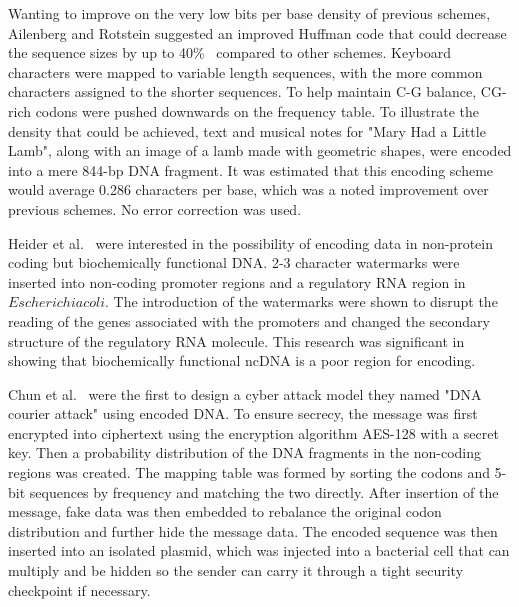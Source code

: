 \documentclass{bioinfo}
\begin{document}
Wanting to improve on the very low bits per base density of previous schemes, Ailenberg and Rotstein suggested an improved Huffman code that could decrease the sequence sizes by up to 40\%~\cite{AR2009BT} compared to other schemes. Keyboard characters were mapped to variable length sequences, with the more common characters assigned to the shorter sequences. To help maintain C-G balance, CG-rich codons were pushed downwards on the frequency table. To illustrate the density that could be achieved, text and musical notes for "Mary Had a Little Lamb", along with an image of a lamb made with geometric shapes, were encoded into a mere 844-bp DNA fragment. It was estimated that this encoding scheme would average 0.286 characters per base, which was a noted improvement over previous schemes. No error correction was used.

Heider et al.~\cite{HPB2009BMCRN} were interested in the possibility of encoding data in non-protein coding but biochemically functional DNA. 2-3 character watermarks were inserted into non-coding promoter regions and a regulatory RNA region in $Escherichia coli$. The introduction of the watermarks were shown to disrupt the reading of the genes associated with the promoters and changed the secondary structure of the regulatory RNA molecule. This research was significant in showing that biochemically functional ncDNA is a poor region for encoding.

Chun et al.~\cite{CLY2015SAPW} were the first to design a cyber attack model they named "DNA courier attack" using encoded DNA. To ensure secrecy, the message was first encrypted into ciphertext using the encryption algorithm AES-128 with a secret key. Then a probability distribution of the DNA fragments in the non-coding regions was created. The mapping table was formed by sorting the codons and 5-bit sequences by frequency and matching the two directly. After insertion of the message, fake data was then embedded to rebalance the original codon distribution and further hide the message data. The encoded sequence was then inserted into an isolated plasmid, which was injected into a bacterial cell that can multiply and be hidden so the sender can carry it through a tight security checkpoint if necessary.
\end{document}
